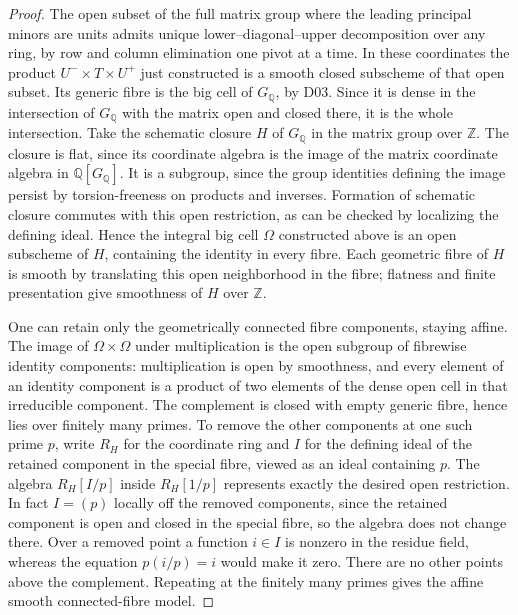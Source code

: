 \documentclass[11pt,a4paper,openany,oneside]{book}
\theoremstyle{resultstyle}
\theoremstyle{definition}
\numberwithin{equation}{chapter}
\newcommand{\ZZ}{\mathbb{Z}}
\newcommand{\QQ}{\mathbb{Q}}
\begin{document}
\begin{proof}
The open subset of the full matrix group
where the leading principal minors are units
admits unique lower--diagonal--upper
decomposition over any ring, by row and
column elimination one pivot at a time. In
these coordinates the product
\(U^-\times T\times U^+\) just constructed
is a smooth closed subscheme of that open
subset. Its generic fibre is the big cell
of \(G_\QQ\), by D03. Since it is dense in
the intersection of \(G_\QQ\) with the
matrix open and closed there, it is the
whole intersection. Take the schematic
closure \(H\) of \(G_\QQ\) in the matrix
group over \(\ZZ\). The closure is flat,
since its coordinate algebra is the image
of the matrix coordinate algebra in
\(\QQ[G_\QQ]\). It is a subgroup, since
the group identities defining the image
persist by torsion-freeness on products
and inverses. Formation of schematic
closure commutes with this open
restriction, as can be checked by
localizing the defining ideal. Hence
the integral big cell \(\Omega\)
constructed above is an open subscheme
of \(H\), containing the identity in
every fibre. Each geometric fibre of
\(H\) is smooth by translating this
open neighborhood in the fibre; flatness
and finite presentation give smoothness of
\(H\) over \(\ZZ\).

One can retain only the geometrically connected fibre components,
staying affine. The image of \(\Omega\times\Omega\) under multiplication
is the open subgroup of fibrewise identity components: multiplication is
open by smoothness, and every element of an identity component is a
product of two elements of the dense open cell in that irreducible
component. The complement is closed with empty generic fibre, hence lies
over finitely many primes. To remove the other components at one such
prime \(p\), write \(R_H\) for the coordinate ring and \(I\) for the
defining ideal of the retained component in the special fibre, viewed as
an ideal containing \(p\). The algebra \(R_H[I/p]\) inside \(R_H[1/p]\)
represents exactly the desired open restriction. In fact \(I=(p)\)
locally off the removed components, since the retained component is open
and closed in the special fibre, so the algebra does not change there.
Over a removed point a function \(i\in I\) is nonzero in the residue
field, whereas the equation \(p(i/p)=i\) would make it zero. There are
no other points above the complement. Repeating at the finitely many
primes gives the affine smooth connected-fibre model.


\end{proof}
\end{document}

